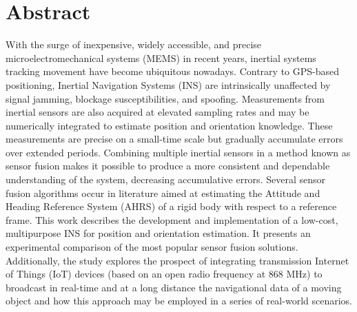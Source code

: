 \chapter*{Abstract}
\justify
With the surge of inexpensive, widely accessible, and precise microelectromechanical systems (MEMS) in recent years, inertial systems tracking movement have become ubiquitous nowadays. Contrary to GPS-based positioning, Inertial Navigation Systems (INS) are intrinsically unaffected by signal jamming, blockage susceptibilities, and spoofing. Measurements from inertial sensors are also acquired at elevated sampling rates and may be numerically integrated to estimate position and orientation knowledge. These measurements are precise on a small-time scale but gradually accumulate errors over extended periods. Combining multiple inertial sensors in a method known as sensor fusion makes it possible to produce a more consistent and dependable understanding of the system, decreasing accumulative errors. Several sensor fusion algorithms occur in literature aimed at estimating the Attitude and Heading Reference System (AHRS) of a rigid body with respect to a reference frame. This work describes the development and implementation of a low-cost, multipurpose INS for position and orientation estimation. It presents an experimental comparison of the most popular sensor fusion solutions. Additionally, the study explores the prospect of integrating transmission Internet of Things (IoT) devices (based on an open radio frequency at 868 MHz) to broadcast in real-time and at a long distance the navigational data of a moving object and how this approach may be employed in a series of real-world scenarios.

